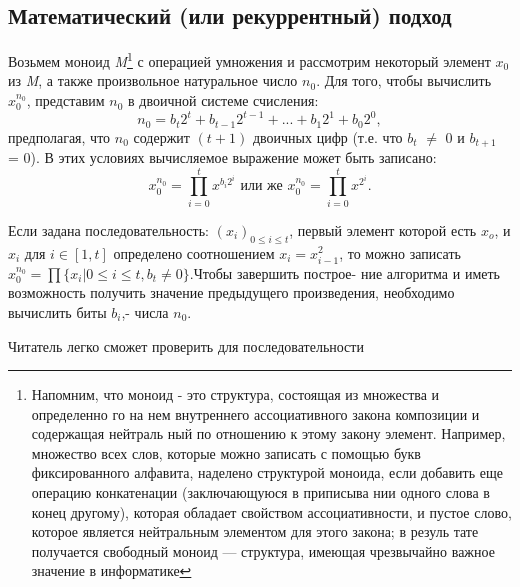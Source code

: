 \subsection{ Математический (или рекуррентный) подход}
Возьмем моноид \textit{M}\footnote{ Напомним, что моноид - это структура, состоящая из множества и определенно­
го на нем внутреннего ассоциативного закона композиции и содержащая нейтраль­
ный по отношению к этому закону элемент. Например, множество всех слов, которые
можно записать с  помощью букв фиксированного алфавита, наделено структурой
моноида, если добавить еще операцию конкатенации (заключающуюся в приписыва­
нии одного слова в конец другому), которая обладает свойством ассоциативности, и
пустое слово, которое является нейтральным элементом для этого закона; в резуль­
тате  получается  свободный  моноид  —  структура, имеющая  чрезвычайно  важное
значение в информатике} с операцией умножения и рассмотрим некоторый 
элемент $x_0$ из \textit{M}, а также произвольное натуральное число $n_{0}$. Для того, 
чтобы вычислить $x_{0}^{n_{0}}$, представим $n_{0}$ в двоичной системе счисления:
\begin{equation*}
n_{0} = b_{t}2^{t} + b_{t - 1}2^{t - 1} + ... + b_{1}2^{1} + b_{0}2^{0},
\end{equation*}
предполагая, что $n_{0}$ содержит \textit{$(t + 1)$} двоичных цифр (т.е. что $b_{t}$ $\neq$ 0 и  \linebreak
$b_{t + 1}$ = 0). В этих условиях вычисляемое выражение может быть запи­сано:
\begin{equation*}
x_{0}^{n_{0}} = \prod_{i=0}^t x^{b_{i}2^{i}} \text{  или же  } x_{0}^{n_{0}} = \prod_{i=0}^t x^{2^{i}}.
\end{equation*}
\newline

Если задана последовательность: $(x_{i})_{0 \leqslant i \leqslant t}$, первый  элемент  которой 
\newline
есть $x_{o}$, и $x_{i}$ для \textit{$i \in [1,t]$} определено соотношением \textit{$x_{i} = x_{i-1}^2$}, то можно\linebreak
записать $x_{0}^{n_{0}} = \prod \{ x_{i} | 0 \leqslant i \leqslant t, b_{t} \neq 0\}$.Чтобы завершить построе-\linebreak
ние алгоритма и иметь возможность получить значение предыдущего\linebreak
произведения, необходимо вычислить биты $b_{i}$,- числа $n_{0}$.

Читатель легко сможет проверить для последовательности

